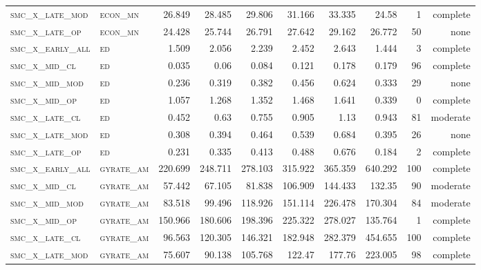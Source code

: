 \begin{landscape}
\begin{center}
\begin{footnotesize}
\begin{longtable}{llrrrrr|rrr}
\textsc{smc\_x\_late\_mod } & \textsc{econ\_mn  }   & 26.849   & 28.485   & 29.806   & 31.166   & 33.335   & 24.58    & 1   & complete \\
\textsc{smc\_x\_late\_op  } & \textsc{econ\_mn  }   & 24.428   & 25.744   & 26.791   & 27.642   & 29.162   & 26.772   & 50  & none     \\
\textsc{smc\_x\_early\_all} & \textsc{ed        }   & 1.509    & 2.056    & 2.239    & 2.452    & 2.643    & 1.444    & 3   & complete \\
\textsc{smc\_x\_mid\_cl   } & \textsc{ed        }   & 0.035    & 0.06     & 0.084    & 0.121    & 0.178    & 0.179    & 96  & complete \\
\textsc{smc\_x\_mid\_mod  } & \textsc{ed        }   & 0.236    & 0.319    & 0.382    & 0.456    & 0.624    & 0.333    & 29  & none     \\
\textsc{smc\_x\_mid\_op   } & \textsc{ed        }   & 1.057    & 1.268    & 1.352    & 1.468    & 1.641    & 0.339    & 0   & complete \\
\textsc{smc\_x\_late\_cl  } & \textsc{ed        }   & 0.452    & 0.63     & 0.755    & 0.905    & 1.13     & 0.943    & 81  & moderate \\
\textsc{smc\_x\_late\_mod } & \textsc{ed        }   & 0.308    & 0.394    & 0.464    & 0.539    & 0.684    & 0.395    & 26  & none     \\
\textsc{smc\_x\_late\_op  } & \textsc{ed        }   & 0.231    & 0.335    & 0.413    & 0.488    & 0.676    & 0.184    & 2   & complete \\
\textsc{smc\_x\_early\_all} & \textsc{gyrate\_am}   & 220.699  & 248.711  & 278.103  & 315.922  & 365.359  & 640.292  & 100 & complete \\
\textsc{smc\_x\_mid\_cl   } & \textsc{gyrate\_am}   & 57.442   & 67.105   & 81.838   & 106.909  & 144.433  & 132.35   & 90  & moderate \\
\textsc{smc\_x\_mid\_mod  } & \textsc{gyrate\_am}   & 83.518   & 99.496   & 118.926  & 151.114  & 226.478  & 170.304  & 84  & moderate \\
\textsc{smc\_x\_mid\_op   } & \textsc{gyrate\_am}   & 150.966  & 180.606  & 198.396  & 225.322  & 278.027  & 135.764  & 1   & complete \\
\textsc{smc\_x\_late\_cl  } & \textsc{gyrate\_am}   & 96.563   & 120.305  & 146.321  & 182.948  & 282.379  & 454.655  & 100 & complete \\
\textsc{smc\_x\_late\_mod } & \textsc{gyrate\_am}   & 75.607   & 90.138   & 105.768  & 122.47   & 177.76   & 223.005  & 98  & complete \\

\end{longtable}
\end{footnotesize}
\end{center}
\end{landscape}

